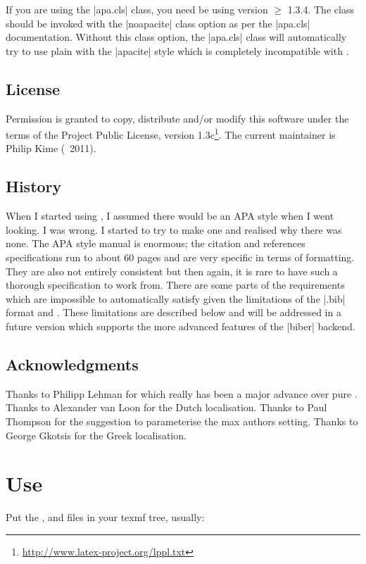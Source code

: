 \documentclass{ltxdockit}
\begin{document}
If you are using the |apa.cls| \latex class, you need be using version
$\geq$ 1.3.4. The class should be invoked with the |noapacite| class option
as per the |apa.cls| documentation. Without this class option, the
|apa.cls| class will automatically try to use plain \bibtex with the
|apacite| style which is completely incompatible with .

\subsection{License}

Permission is granted to copy, distribute and/or modify this software under
the terms of the \latex Project Public License, version
1.3c\footnote{\url{http://www.latex-project.org/lppl.txt}}. The current
maintainer is Philip Kime (\textcopyright\ 2011).

\subsection{History}

When I started using , I assumed there would be an APA style
when I went looking. I was wrong. I started to try to make one and realised
why there was none. The APA style manual is enormous; the citation and
references specifications run to about 60 pages and are very specific in
terms of formatting. They are also not entirely consistent but then again,
it is rare to have such a thorough specification to work from. There are
some parts of the requirements which are impossible to automatically
satisfy given the limitations of the |.bib| format and \bibtex. These
limitations are described below and will be addressed in a future
 version which supports the more advanced features of the
|biber| backend.

\subsection{Acknowledgments}

Thanks to Philipp Lehman for  which really has been a major
advance over pure \bibtex. Thanks to Alexander van Loon for the Dutch
localisation. Thanks to Paul Thompson for the suggestion to
parameterise the max authors setting. Thanks to George Gkotsis for the
Greek localisation.

\section{Use}\label{ref:use}
\label{use}
Put the ,  and  files in your texmf tree, usually:\\
\end{document}
